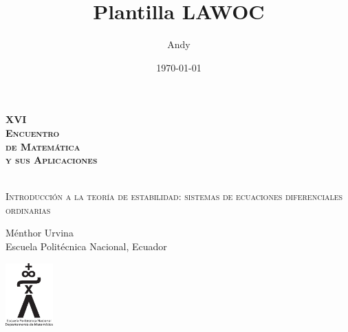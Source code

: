 \documentclass[a5paper,doc,10pt,noapacite]{apa6}
\title{Plantilla LAWOC}
\author{Andy}
\date{\today}
\newcommand{\EPN}{Escuela Politécnica Nacional}
\begin{document}
\pagestyle{empty}
{
	\HUGE
	{\bf\textsc{XVI \\[0.5cm] Encuentro  \\[0.5cm] de Matemática \\[0.5cm] y sus Aplicaciones \\[0.5cm] }}
	\\[1cm]
	\large
	
	\vspace{-1.75cm}
	\begin{center}
		
		\textsc{Introducción a la teoría de estabilidad: sistemas de ecuaciones diferenciales ordinarias}
		
		\vspace{1\baselineskip}
		
		Ménthor Urvina
		\\
		
		\normalsize
		\EPN, Ecuador
	\end{center}
}

\vspace{1.75cm}
\begin{center}
	\includegraphics[height=2.45cm]{Logos/DM-EPN}
\end{center}
\end{document}
